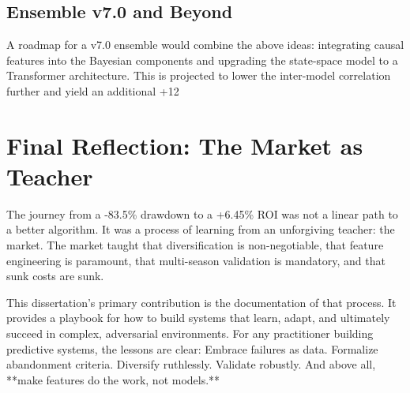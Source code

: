 \subsection{Ensemble v7.0 and Beyond}
A roadmap for a v7.0 ensemble would combine the above ideas: integrating causal features into the Bayesian components and upgrading the state-space model to a Transformer architecture. This is projected to lower the inter-model correlation further and yield an additional +12%

\section{Final Reflection: The Market as Teacher}

The journey from a -83.5\% drawdown to a +6.45\% ROI was not a linear path to a better algorithm. It was a process of learning from an unforgiving teacher: the market. The market taught that diversification is non-negotiable, that feature engineering is paramount, that multi-season validation is mandatory, and that sunk costs are sunk.

This dissertation's primary contribution is the documentation of that process. It provides a playbook for how to build systems that learn, adapt, and ultimately succeed in complex, adversarial environments. For any practitioner building predictive systems, the lessons are clear: Embrace failures as data. Formalize abandonment criteria. Diversify ruthlessly. Validate robustly. And above all, **make features do the work, not models.**
